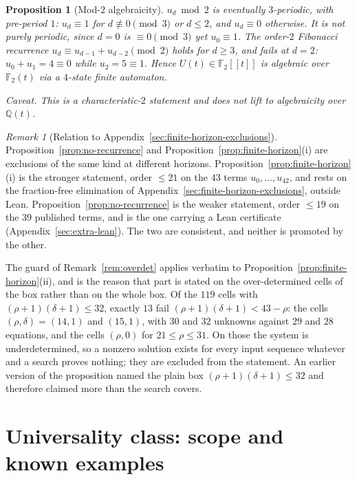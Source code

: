 \documentclass[11pt]{article}
\theoremstyle{plain}
\newtheorem{proposition}[theorem]{Proposition}
\theoremstyle{definition}
\theoremstyle{remark}
\newtheorem{remark}[theorem]{Remark}
\begin{document}
\begin{proposition}[Mod-$2$ algebraicity]
\label{prop:mod2-automaton}
$u_d \bmod 2$ is \emph{eventually} $3$-periodic, with pre-period $1$:
$u_d \equiv 1$ for $d \not\equiv 0 \pmod 3$ or $d \le 2$, and
$u_d \equiv 0$ otherwise. It is not purely periodic, since $d = 0$ is
$\equiv 0 \pmod 3$ yet $u_0 \equiv 1$. The order-$2$ Fibonacci
recurrence $u_d \equiv u_{d-1} + u_{d-2} \pmod 2$ holds for $d \ge 3$,
and fails at $d = 2$: $u_0 + u_1 = 4 \equiv 0$ while $u_2 = 5 \equiv 1$.
Hence
$U(t) \in \mathbb{F}_2[[t]]$ is algebraic over $\mathbb{F}_2(t)$ via a
$4$-state finite automaton.

\emph{Caveat.}  This is a characteristic-$2$ statement and does not
lift to algebraicity over $\mathbb{Q}(t)$.
\end{proposition}

\begin{remark}[Relation to Appendix~\ref{sec:finite-horizon-exclusions}]
\label{rem:extra-vs-appA}
Proposition~\ref{prop:no-recurrence} and
Proposition~\ref{prop:finite-horizon}(i) are exclusions of the same kind at
different horizons. Proposition~\ref{prop:finite-horizon}(i) is the stronger
statement, order $\le 21$ on the $43$ terms $u_0,\ldots,u_{42}$, and rests on
the fraction-free elimination of
Appendix~\ref{sec:finite-horizon-exclusions}, outside Lean.
Proposition~\ref{prop:no-recurrence} is the weaker statement, order $\le 19$
on the $39$ published terms, and is the one carrying a Lean certificate
(Appendix~\ref{sec:extra-lean}). The two are consistent, and neither is
promoted by the other.

The guard of Remark~\ref{rem:overdet} applies verbatim to
Proposition~\ref{prop:finite-horizon}(ii), and is the reason that part is
stated on the over-determined cells of the box rather than on the whole box.
Of the $119$ cells with $(\rho+1)(\delta+1)\le 32$, exactly $13$ fail
$(\rho+1)(\delta+1) < 43-\rho$: the cells $(\rho,\delta) = (14,1)$ and
$(15,1)$, with $30$ and $32$ unknowns against $29$ and $28$ equations, and
the cells $(\rho,0)$ for $21 \le \rho \le 31$. On those the system is
underdetermined, so a nonzero solution exists for every input sequence
whatever and a search proves nothing; they are excluded from the statement.
An earlier version of the proposition named the plain box
$(\rho+1)(\delta+1)\le 32$ and therefore claimed more than the search
covers.
\end{remark}

\section{Universality class: scope and known examples}
\label{sec:universality-class}
\end{document}
